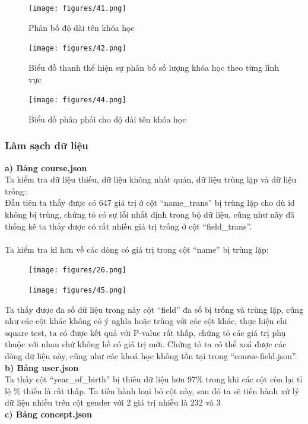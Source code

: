 \newpage
\begin{figure}[H]
    \centering
    \texttt{[image: figures/41.png]}
    \caption{Phân bố độ dài tên khóa học}
\end{figure}
\begin{figure}[H]
    \centering
    \texttt{[image: figures/42.png]}
    \caption{Biểu đồ thanh thể hiện sự phân bố số lượng khóa học theo từng lĩnh vực}
\end{figure}
\newpage
\begin{figure}[H]
    \centering
    \texttt{[image: figures/44.png]}
    \caption{Biểu đồ phân phối cho độ dài tên khóa học}
\end{figure}
\subsubsection{Làm sạch dữ liệu}
\textbf{a) Bảng course.json}\\
Ta kiểm tra dữ liệu thiếu, dữ liệu không nhất quán, dữ liệu trùng lặp và dữ liệu trống:
\\
Đầu tiên ta thấy được có 647 giá trị ở cột “name\_trans” bị trùng lặp cho dù id không bị trùng, chứng tỏ có sự lỗi nhất định trong bộ dữ liệu, cũng như nãy đã thống kê ta thấy được có rất nhiều giá trị trống ở cột “field\_trans”.\\
\\
Ta kiểm tra kĩ hơn về các dòng có giá trị trong cột “name” bị trùng lặp:
\begin{figure}[H]
    \centering
    \texttt{[image: figures/26.png]}
\end{figure}
\newpage
\begin{figure}[H]
    \centering
    \texttt{[image: figures/45.png]}
\end{figure}
Ta thấy được đa số dữ liệu trong này cột “field” đa số bị trống và trùng lặp, cũng như các cột khác không có ý nghĩa hoặc trùng với các cột khác, thực hiện chi square test, ta có được kết quả với P-value rất thấp, chứng tỏ các giá trị phụ thuộc với nhau chứ không hề có giá trị mới. Chứng tỏ ta có thể xoá được các dòng dữ liệu này, cũng như các khoá học không tồn tại trong “course-field.json”.\\
\textbf{b) Bảng user.json}\\
Ta thấy cột “year\_of\_birth” bị thiếu dữ liệu hơn 97\% trong khi các cột còn lại tỉ lệ \% thiếu là rất thấp. Ta tiến hành loại bỏ cột này, sau đó ta sẽ tiến hành xử lý dữ liệu nhiễu trên cột gender với 2 giá trị nhiễu là 232 và 3\\
\textbf{c) Bảng concept.json}\\
